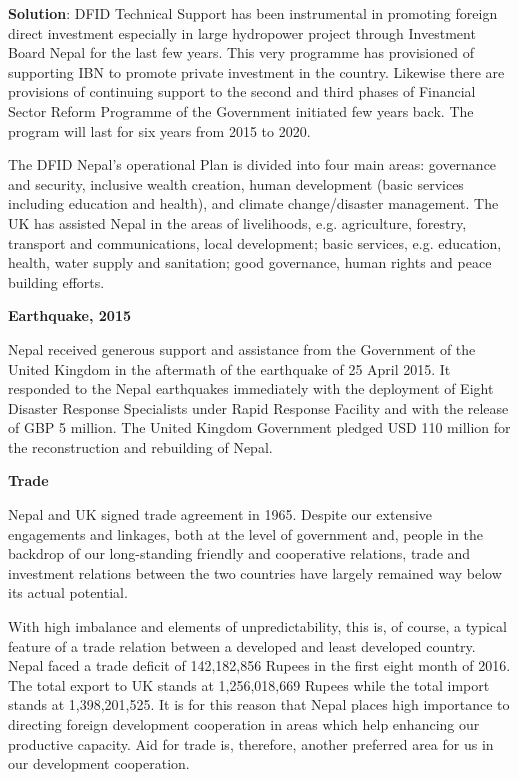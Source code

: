 \documentclass[
  openany]{book}
\newenvironment{solution}{ {\bfseries Solution}:}{}
\begin{document}
\begin{questions}
\begin{solution}
DFID Technical Support has been instrumental in promoting foreign direct investment especially in large hydropower project through Investment Board Nepal for the last few years. This very programme has provisioned of supporting IBN to promote private investment in the country. Likewise there are provisions of continuing support to the second and third phases of Financial Sector Reform Programme of the Government initiated few years back. The program will last for six years from 2015 to 2020.

The DFID Nepal's operational Plan is divided into four main areas: governance and security, inclusive wealth creation, human development (basic services including education and health), and climate change/disaster management. The UK has assisted Nepal in the areas of livelihoods, e.g. agriculture, forestry, transport and communications, local development; basic services, e.g. education, health, water supply and sanitation; good governance, human rights and peace building efforts.

\textbf{Earthquake, 2015}

Nepal received generous support and assistance from the Government of the United Kingdom in the aftermath of the earthquake of 25 April 2015. It responded to the Nepal earthquakes immediately with the deployment of Eight Disaster Response Specialists under Rapid Response Facility and with the release of GBP 5 million. The United Kingdom Government pledged USD 110 million for the reconstruction and rebuilding of Nepal. 

\textbf{Trade}

Nepal and UK signed trade agreement in 1965. Despite our extensive engagements and linkages, both at the level of government and, people in the backdrop of our long-standing friendly and cooperative relations, trade and investment relations between the two countries have largely remained way below its actual potential.

With high imbalance and elements of unpredictability, this is, of course, a typical feature of a trade relation between a developed and least developed country. Nepal faced a trade deficit of 142,182,856 Rupees in the first eight month of 2016. The total export to UK stands at 1,256,018,669 Rupees while the total import stands at 1,398,201,525. It is for this reason that Nepal places high importance to directing foreign development cooperation in areas which help enhancing our productive capacity. Aid for trade is, therefore, another preferred area for us in our development cooperation. 


\end{solution}
\end{questions}
\end{document}
